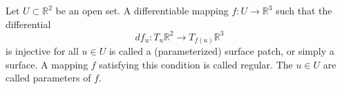 Let $U \subset \mathbb{R}^2$ be an open set. A differentiable mapping $f: U \to \mathbb{R}^3$ such that the differential
$$df_u: T_u \mathbb{R}^2 \to T_{f(u)} \mathbb{R}^3$$
is injective for all $u \in U$ is called a (parameterized) surface patch, or simply a surface. A mapping $f$ satisfying this condition is called regular. The $u \in U$ are called parameters of $f$.
